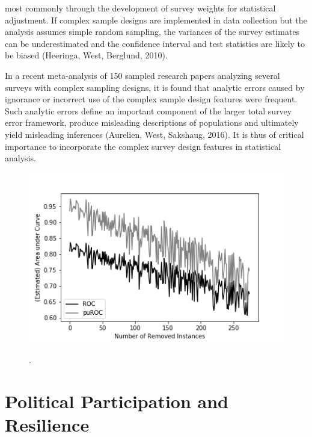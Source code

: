 most commonly through the development of survey weights for statistical adjustment. If complex sample designs are implemented in data collection but the analysis assumes simple random sampling, the variances of the survey estimates can be underestimated and the confidence interval and test statistics are likely to be biased (Heeringa, West,  Berglund, 2010).

In a recent meta-analysis of 150 sampled research papers analyzing several surveys with complex sampling designs, it is found that analytic errors caused by ignorance or incorrect use of the complex sample design features were frequent. Such analytic errors define an important component of the larger total survey error framework, produce misleading descriptions of populations and ultimately yield misleading inferences (Aurelien, West,  Sakshaug, 2016). It is thus of critical importance to incorporate the complex survey design features in statistical analysis. 

\begin{figure}[ht]
	\begin{center}
		\includegraphics[scale=0.70,angle=0]{fig/roc_AUC}
		\label{occ}
		\vspace*{-1.0cm}
		\caption{.}
	\end{center}
\end{figure}

\section{Political Participation and Resilience}

